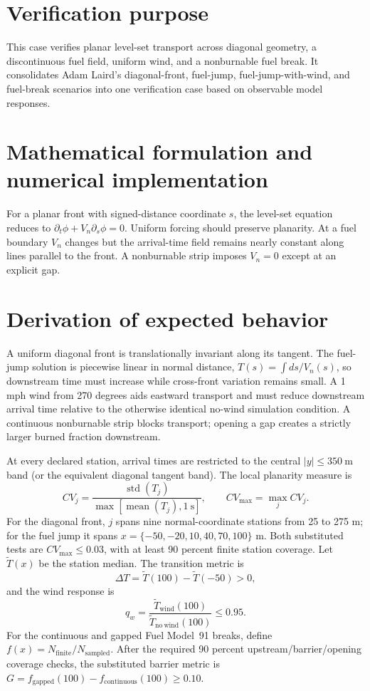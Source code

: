 \section{Verification purpose}

This case verifies planar level-set transport across diagonal geometry, a discontinuous fuel field, uniform wind, and a nonburnable fuel break. It consolidates Adam Laird's diagonal-front, fuel-jump, fuel-jump-with-wind, and fuel-break scenarios into one verification case based on observable model responses.

\section{Mathematical formulation and numerical implementation}

For a planar front with signed-distance coordinate $s$, the level-set equation reduces to $\partial_t\phi+V_n\partial_s\phi=0$. Uniform forcing should preserve planarity. At a fuel boundary $V_n$ changes but the arrival-time field remains nearly constant along lines parallel to the front. A nonburnable strip imposes $V_n=0$ except at an explicit gap.

\section{Derivation of expected behavior}

A uniform diagonal front is translationally invariant along its tangent. The fuel-jump solution is piecewise linear in normal distance, $T(s)=\int ds/V_n(s)$, so downstream time must increase while cross-front variation remains small. A 1 mph wind from 270 degrees aids eastward transport and must reduce downstream arrival time relative to the otherwise identical no-wind simulation condition. A continuous nonburnable strip blocks transport; opening a gap creates a strictly larger burned fraction downstream.

At every declared station, arrival times are restricted to the central
\(|y|\leq350~\mathrm{m}\) band (or the equivalent diagonal tangent band).
The local planarity measure is
\[
 CV_j=\frac{\operatorname{std}(T_j)}
            {\max[\operatorname{mean}(T_j),1~\mathrm{s}]},
 \qquad CV_{\max}=\max_jCV_j.
\]
For the diagonal front, \(j\) spans nine normal-coordinate stations from
25 to 275 m; for the fuel jump it spans
\(x=\{-50,-20,10,40,70,100\}\) m.  Both substituted tests are
\(CV_{\max}\leq0.03\), with at least 90 percent finite station coverage.
Let \(\widetilde T(x)\) be the station median.  The transition metric is
\[
 \Delta T=\widetilde T(100)-\widetilde T(-50)>0,
\]
and the wind response is
\[
 q_w=\frac{\widetilde T_{\mathrm{wind}}(100)}
           {\widetilde T_{\mathrm{no\ wind}}(100)}\leq0.95.
\]
For the continuous and gapped Fuel Model~91 breaks, define
\(f(x)=N_{\mathrm{finite}}/N_{\mathrm{sampled}}\).  After the required
90 percent upstream/barrier/opening coverage checks, the substituted
barrier metric is
\(G=f_{\mathrm{gapped}}(100)-f_{\mathrm{continuous}}(100)\geq0.10\).

